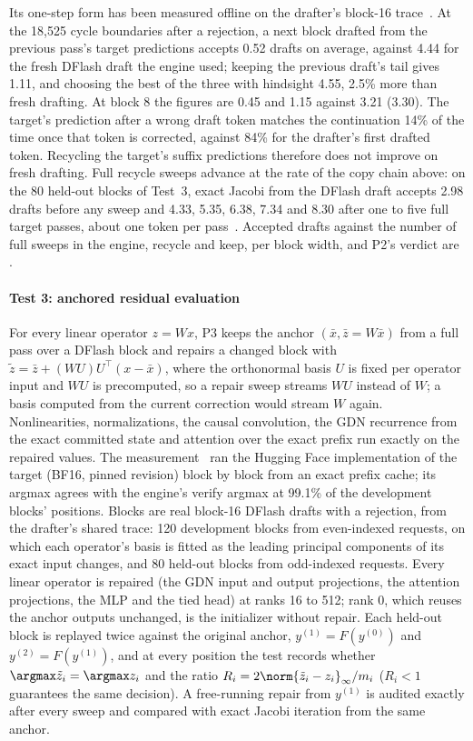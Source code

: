 Its one-step form has been measured offline on the drafter's block-16 trace~. At the 18,525 cycle boundaries after a rejection, a next block drafted from the previous pass's target predictions accepts 0.52 drafts on average, against 4.44 for the fresh DFlash draft the engine used; keeping the previous draft's tail gives 1.11, and choosing the best of the three with hindsight 4.55, 2.5\% more than fresh drafting. At block 8 the figures are 0.45 and 1.15 against 3.21 (3.30). The target's prediction after a wrong draft token matches the continuation 14\% of the time once that token is corrected, against 84\% for the drafter's first drafted token. Recycling the target's suffix predictions therefore does not improve on fresh drafting. Full recycle sweeps advance at the rate of the copy chain above: on the 80 held-out blocks of Test~3, exact Jacobi from the DFlash draft accepts 2.98 drafts before any sweep and 4.33, 5.35, 6.38, 7.34 and 8.30 after one to five full target passes, about one token per pass~. Accepted drafts against the number of full sweeps in the engine, recycle and keep, per block width, and P2's verdict are .

\paragraph{Test 3: anchored residual evaluation}\label{sec:repair-residual} For every linear operator $z=Wx$, P3 keeps the anchor $(\bar x,\bar z=W\bar x)$ from a full pass over a DFlash block and repairs a changed block with $\tilde z=\bar z+(WU)U^\top(x-\bar x)$, where the orthonormal basis $U$ is fixed per operator input and $WU$ is precomputed, so a repair sweep streams $WU$ instead of $W$; a basis computed from the current correction would stream $W$ again. Nonlinearities, normalizations, the causal convolution, the GDN recurrence from the exact committed state and attention over the exact prefix run exactly on the repaired values. The measurement~ ran the Hugging Face implementation of the target (BF16, pinned revision) block by block from an exact prefix cache; its argmax agrees with the engine's verify argmax at 99.1\% of the development blocks' positions. Blocks are real block-16 DFlash drafts with a rejection, from the drafter's shared trace: 120 development blocks from even-indexed requests, on which each operator's basis is fitted as the leading principal components of its exact input changes, and 80 held-out blocks from odd-indexed requests. Every linear operator is repaired (the GDN input and output projections, the attention projections, the MLP and the tied head) at ranks 16 to 512; rank 0, which reuses the anchor outputs unchanged, is the initializer without repair. Each held-out block is replayed twice against the original anchor, $y^{(1)}=F(y^{(0)})$ and $y^{(2)}=F(y^{(1)})$, and at every position the test records whether $\argmax\tilde z_i=\argmax z_i$ and the ratio $R_i=2\norm{\tilde z_i-z_i}_\infty/m_i$ ($R_i<1$ guarantees the same decision). A free-running repair from $y^{(1)}$ is audited exactly after every sweep and compared with exact Jacobi iteration from the same anchor.

